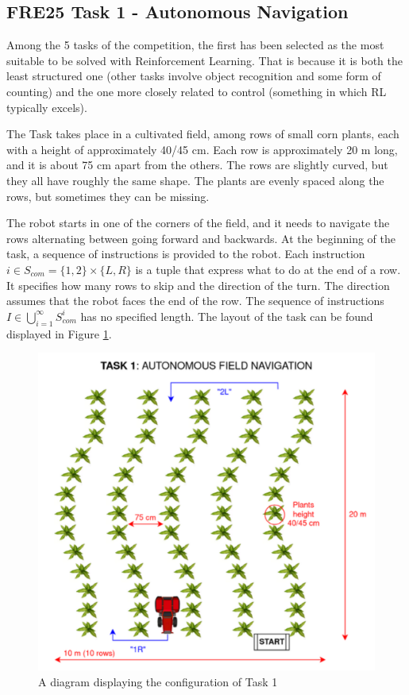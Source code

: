 \documentclass[11pt,a4paper,twocolumn]{article}
\begin{document}
\subsection{FRE25 Task 1 - Autonomous Navigation}
\label{subsec:task1}
Among the 5 tasks of the competition, the first has been selected as the most suitable to be solved with Reinforcement Learning. That is because it is both the least structured one (other tasks involve object recognition and some form of counting) and the one more closely related to control (something in which RL typically excels).

The Task takes place in a cultivated field, among rows of small corn plants, each with a height of approximately 40/45 cm. Each row is approximately 20 m long, and it is about 75 cm apart from the others. The rows are slightly curved, but they all have roughly the same shape. The plants are evenly spaced along the rows, but sometimes they can be missing.

The robot starts in one of the corners of the field, and it needs to navigate the rows alternating between going forward and backwards. At the beginning of the task, a sequence of instructions is provided to the robot. Each instruction $i \in S_{com} = \{1,2\} \times \{L, R\}$ is a tuple that express what to do at the end of a row. It specifies how many rows to skip and the direction of the turn. The direction assumes that the robot faces the end of the row. The sequence of instructions $I \in \bigcup_{i=1}^{\infty}S_{com}^i$ has no specified length. The layout of the task can be found displayed in Figure \ref{fig:task1}.

\begin{figure}
    \centering
    \includegraphics[width=\linewidth]{Multidisciplinary_Project_Report//Images/Task1Schema.png}
    \caption{A diagram displaying the configuration of Task 1}
    \label{fig:task1}
\end{figure}
\end{document}
